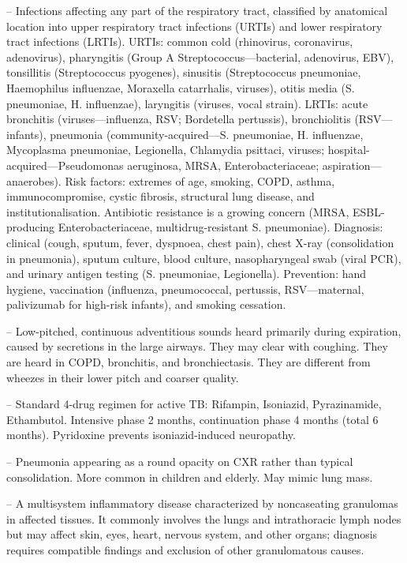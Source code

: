 -- Infections affecting any part of the respiratory tract, classified by anatomical location into upper respiratory tract infections (URTIs) and lower respiratory tract infections (LRTIs). URTIs: common cold (rhinovirus, coronavirus, adenovirus), pharyngitis (Group A Streptococcus—bacterial, adenovirus, EBV), tonsillitis (Streptococcus pyogenes), sinusitis (Streptococcus pneumoniae, Haemophilus influenzae, Moraxella catarrhalis, viruses), otitis media (S. pneumoniae, H. influenzae), laryngitis (viruses, vocal strain). LRTIs: acute bronchitis (viruses—influenza, RSV; Bordetella pertussis), bronchiolitis (RSV—infants), pneumonia (community-acquired—S. pneumoniae, H. influenzae, Mycoplasma pneumoniae, Legionella, Chlamydia psittaci, viruses; hospital-acquired—Pseudomonas aeruginosa, MRSA, Enterobacteriaceae; aspiration—anaerobes). Risk factors: extremes of age, smoking, COPD, asthma, immunocompromise, cystic fibrosis, structural lung disease, and institutionalisation. Antibiotic resistance is a growing concern (MRSA, ESBL-producing Enterobacteriaceae, multidrug-resistant S. pneumoniae). Diagnosis: clinical (cough, sputum, fever, dyspnoea, chest pain), chest X-ray (consolidation in pneumonia), sputum culture, blood culture, nasopharyngeal swab (viral PCR), and urinary antigen testing (S. pneumoniae, Legionella). Prevention: hand hygiene, vaccination (influenza, pneumococcal, pertussis, RSV—maternal, palivizumab for high-risk infants), and smoking cessation.

-- Low-pitched, continuous adventitious sounds heard primarily during expiration, caused by secretions in the large airways. They may clear with coughing. They are heard in COPD, bronchitis, and bronchiectasis. They are different from wheezes in their lower pitch and coarser quality.

-- Standard 4-drug regimen for active TB: Rifampin, Isoniazid, Pyrazinamide, Ethambutol. Intensive phase 2 months, continuation phase 4 months (total 6 months). Pyridoxine prevents isoniazid-induced neuropathy.

-- Pneumonia appearing as a round opacity on CXR rather than typical consolidation. More common in children and elderly. May mimic lung mass.

-- A multisystem inflammatory disease characterized by noncaseating granulomas in affected tissues. It commonly involves the lungs and intrathoracic lymph nodes but may affect skin, eyes, heart, nervous system, and other organs; diagnosis requires compatible findings and exclusion of other granulomatous causes.

